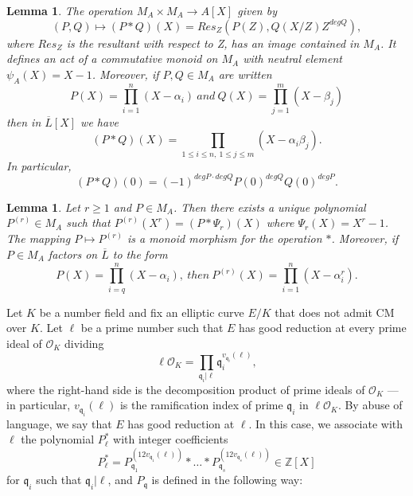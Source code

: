 \documentclass{amsart}
\newtheorem{lemma}[theorem]{Lemma}
\theoremstyle{definition}
\newcommand{\OK}{\mathcal{O}_K}
\newcommand{\Z}{\mathbb{Z}}
\newcommand{\q}{\mathfrak{q}}
\begin{document}
\begin{lemma} The operation $M_A \times M_A \rightarrow A[X]$ given by
\begin{equation}(P,Q) \mapsto (P*Q)(X) = Res_Z(P(Z),Q(X/Z)Z^{degQ}), \nonumber
\end{equation}
where $Res_Z$ is the resultant with respect to Z, has an image contained in $M_A$. It defines an act of a commutative monoid on $M_A$ with neutral element $\psi_A(X) = X-1$. Moreover, if $P,Q \in M_A$ are written
\begin{equation}
P(X) = \prod_{i=1}^{n}(X-\alpha_i) \ and \ Q(X) = \prod_{j=1}^{m}(X-\beta_j) \nonumber
\end{equation}
then in $\overline{L}[X]$ we have
\begin{equation}
(P*Q)(X) = \prod_{1 \leq i \leq n, \ 1 \leq j \leq m}(X-\alpha_i\beta_j). \nonumber
\end{equation}
In particular,
\begin{equation}
(P*Q)(0) = (-1)^{degP \cdot degQ}P(0)^{degQ}Q(0)^{degP}. \nonumber
\end{equation}
\end{lemma}

\begin{lemma}
Let $r \geq 1$ and $P \in M_A$. Then there exists a unique polynomial $P^{(r)} \in M_A$ such that
$P^{(r)}(X^r) = (P*\Psi_r)(X)$ where $\Psi_r(X) = X^r -1$. The mapping $P \mapsto P^{(r)}$ is a monoid morphism for the operation $*$. Moreover, if $P \in M_A$ factors on $\overline{L}$ to the form
\begin{equation}
P(X) = \prod_{i=q}^{n} (X-\alpha_i), \ then \ P^{(r)}(X) = \prod_{i=1}^{n}(X-\alpha_i^r). \nonumber
\end{equation}
\end{lemma}

Let $K$ be a number field and fix an elliptic curve $E/K$ that does not admit CM over $K$. Let $\ell$ be a prime number such that $E$ has good reduction at every prime ideal of $\OK$ dividing
\begin{equation}
\ell \OK = \prod_{\q_i | \ell} \q_i^{v_{\q_i}(\ell)}, \nonumber
\end{equation}
where the right-hand side is the decomposition product of prime ideals of $\OK$ --- in particular, $v_{\q_i}(\ell)$ is the ramification index of prime $\q_i$ in $\ell\OK$. By abuse of language, we say that $E$ has good reduction at $\ell$. In this case, we associate with $\ell$ the polynomial $P_\ell^*$ with integer coefficients
\begin{equation}
P_\ell^* = P_{\q_1}^{(12v_{\q_1}(\ell))}*\ldots*P_{\q_s}^{(12v_{\q_s}(\ell))} \in \Z[X] \nonumber
\end{equation}
for $\q_i$ such that $\q_i | \ell$, and $P_{\q}$ is defined in the following way:
\end{document}
